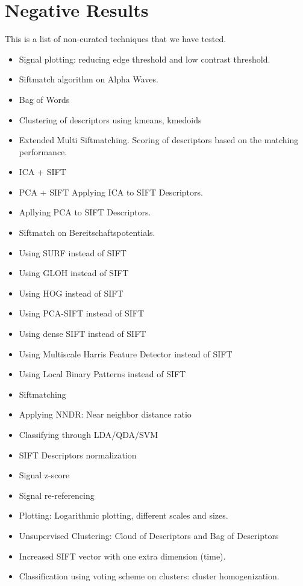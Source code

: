 \chapter{Negative Results}

This is a list of non-curated techniques that we have tested.

\begin{itemize}
\setlength\itemsep{-0.8em}
\item Signal plotting: reducing edge threshold and low contrast threshold.
\item Siftmatch algorithm on Alpha Waves.
\item Bag of Words
\item Clustering of descriptors using kmeans, kmedoids
\item Extended Multi Siftmatching.  Scoring of descriptors based on the matching performance.
\item ICA + SIFT
\item PCA + SIFT
\tiem Applying ICA to SIFT Descriptors.
\item Apllying PCA to SIFT Descriptors.
\item Siftmatch on Bereitschaftspotentials.
\item Using SURF instead of SIFT
\item Using GLOH instead of SIFT
\item Using HOG instead of SIFT
\item Using PCA-SIFT instead of SIFT
\item Using dense SIFT instead of SIFT
\item Using Multiscale Harris Feature Detector instead of SIFT
\item Using Local Binary Patterns instead of SIFT
\item Siftmatching
\item Applying NNDR: Near neighbor distance ratio
\item Classifying through LDA/QDA/SVM
\item SIFT Descriptors normalization
\item Signal z-score
\item Signal re-referencing
\item Plotting: Logarithmic plotting, different scales and sizes.
\item Unsupervised Clustering: Cloud of Descriptors and Bag of Descriptors
\item Increased SIFT vector with one extra dimension (time).
\item Classification using voting scheme on clusters:  cluster homogenization.

\end{itemize}
